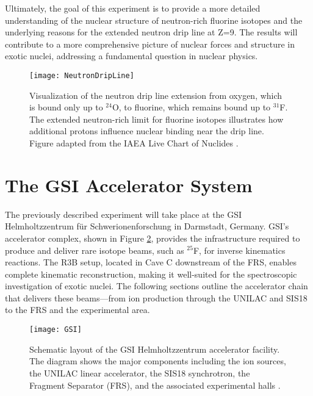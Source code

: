 Ultimately, the goal of this experiment is to provide a more detailed understanding of the nuclear structure of neutron-rich fluorine isotopes and the underlying reasons for the extended neutron drip line at Z=9. The results will contribute to a more comprehensive picture of nuclear forces and structure in exotic nuclei, addressing a fundamental question in nuclear physics.


\begin{figure}
	\texttt{[image: NeutronDripLine]}
	\caption[Extension of the neutron drip line from oxygen to fluorine]{Visualization of the neutron drip line extension from oxygen, which is bound only up to $^{24}$O, to fluorine, which remains bound up to $^{31}$F. The extended neutron-rich limit for fluorine isotopes illustrates how additional protons influence nuclear binding near the drip line. Figure adapted from the IAEA Live Chart of Nuclides \cite{IAEA_NuclideChart}.}
	\label{fig:NeutronDripLine}
\end{figure}


\section{The GSI Accelerator System}

The previously described experiment will take place at the GSI Helmholtzzentrum für Schwerionenforschung in Darmstadt, Germany. GSI’s accelerator complex, shown in Figure \ref{fig:GSI}, provides the infrastructure required to produce and deliver rare isotope beams, such as $^{25}$F, for inverse kinematics reactions. The \gls{R3B} setup, located in Cave C downstream of the FRS, enables complete kinematic reconstruction, making it well-suited for the spectroscopic investigation of exotic nuclei. The following sections outline the accelerator chain that delivers these beams—from ion production through the UNILAC and SIS18 to the FRS and the experimental area.

\begin{figure}
	\texttt{[image: GSI]}
	\caption[Layout of the GSI accelerator facility]{Schematic layout of the GSI Helmholtzzentrum accelerator facility. The diagram shows the major components including the ion sources, the UNILAC linear accelerator, the SIS18 synchrotron, the Fragment Separator (FRS), and the associated experimental halls \cite{gsiAcceleratorFacility}.}
	\label{fig:GSI}
\end{figure}


